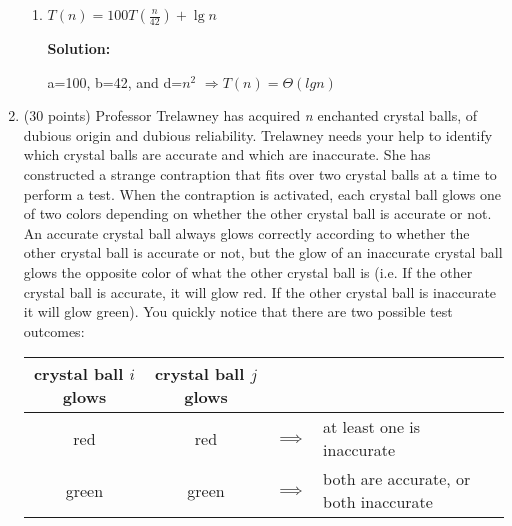\documentclass[12pt]{article}
\begin{document}
\begin{enumerate}
\begin{enumerate}
		\item $T(n) = 100T(\frac{n}{42}) + \lg n$\par
		\textbf{Solution:}\par
		a=100, b=42, and d=$n^{2}$ $\Rightarrow T(n)=\Theta(lgn)$\par
	\end{enumerate}

    \newpage

	\item (30 points)
	Professor Trelawney has acquired \textit{n} enchanted crystal balls, of dubious origin and dubious reliability. 
	Trelawney needs your help to identify which crystal balls are accurate and which are inaccurate. She has constructed 
	a strange contraption that fits over two crystal balls at a time to perform a test. When the contraption is activated, 
	each crystal ball glows one of two colors depending on whether the other crystal ball is accurate or not. 
	An accurate crystal ball always glows correctly according to whether the other crystal ball is 
	accurate or not, but the glow of an inaccurate crystal ball glows the opposite color of what the other crystal ball is 
	(i.e. If the other crystal ball is accurate, it will glow red. If the other crystal ball is inaccurate it will glow green). 
	You quickly notice that there are two possible test outcomes:
	\begin{small}
    	\begin{center}
        	\begin{tabular}{ccll}
        	crystal ball $i$ glows & crystal ball $j$ glows & &  \\
        	\hline
        	red & red & $\implies$ & at least one is inaccurate \\
        	green & green & $\implies$ & both are accurate, or both inaccurate \\
        	\end{tabular}
    	\end{center}
	\end{small}


\end{enumerate}
\end{document}
